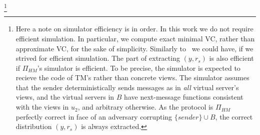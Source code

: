 \documentclass[a4paper]{article}
\begin{document}
\begin{enumerate}
\begin{enumerate}
\begin{enumerate}
		\footnote{Here a note on simulator efficiency is in order. In this work we do not require efficient simulation. In particular, we compute exact minimal VC, rather than approximate VC, for the sake of simplicity. Similarly to~\cite{} we could have, if we strived for efficient simulation. The part of extracting $(y,r_s)$ is also efficient if $\Pi_{HM}$'s simulator is efficient. To be precise, the simulator is expected to recieve the code of TM's rather than concrete views. The simulator assumes that the sender deterministically sends messages as in \emph{all} virtual server's views, and the virtual servers in $B$ have next-message functions consistent with the views in $u_2$, and arbitrary otherwise. As the protocol is $\Pi_{HM}$ perfectly correct in face of an adversary corrupting $\{sender\}\cup B$, the correct distribution $(y,r_s)$ is always extracted.}
		
		\end{enumerate}
	\end{enumerate}	
\end{enumerate}
 
\end{document}
